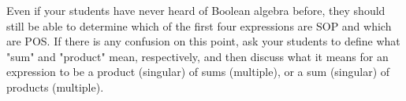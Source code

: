 Even if your students have never heard of Boolean algebra before, they should still be able to determine which of the first four expressions are SOP and which are POS.  If there is any confusion on this point, ask your students to define what "sum" and "product" mean, respectively, and then discuss what it means for an expression to be a product (singular) of sums (multiple), or a sum (singular) of products (multiple).




